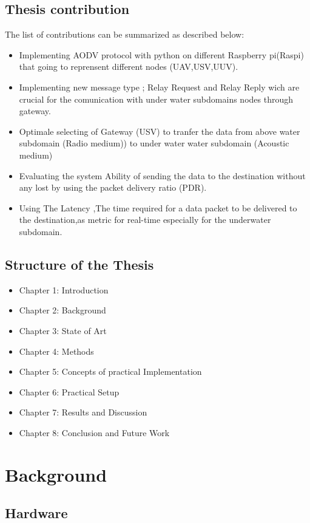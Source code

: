 \documentclass[]{nsm-thesis}
\begin{document}
\section{Thesis contribution}
The list of contributions can be summarized as described below:
\begin{itemize}
    \item Implementing AODV protocol with python on different Raspberry pi(Raspi) that going to reprensent different nodes (UAV,USV,UUV).
    \item Implementing  new message type ; Relay Request and Relay Reply wich are crucial for the comunication with under water subdomains nodes through gateway. 
    \item Optimale selecting of Gateway (USV) to tranfer the data from above water subdomain (Radio medium)) to under water water subdomain (Acoustic medium)  
    \item Evaluating the system Ability of sending the data to the destination without any lost by using the packet delivery ratio (PDR).
    \item Using The Latency ,The time required for a data packet to be delivered to the destination,as metric for real-time especially for the underwater subdomain.
\end{itemize}
\section{Structure of the Thesis}

\begin{itemize}
\item Chapter 1: Introduction 
\item Chapter 2: Background
\item Chapter 3: State of Art 
\item Chapter 4: Methods
\item Chapter 5: Concepts of practical Implementation
\item Chapter 6: Practical Setup 
\item Chapter 7: Results and Discussion
\item Chapter 8: Conclusion and Future Work

\end{itemize}

\chapter{Background}
\section{Hardware}
\end{document}
